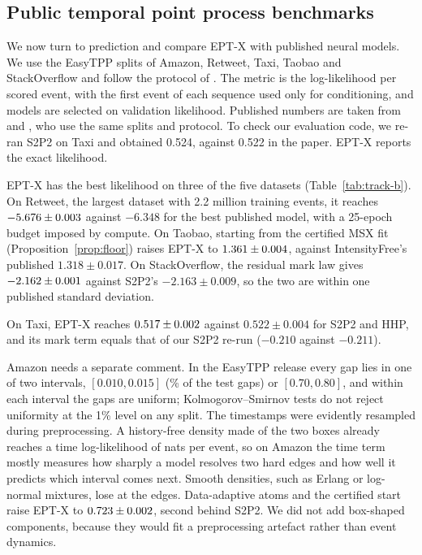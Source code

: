 \begin{table}[!htbp]\centering\small
\caption{Synthetic recovery: held-out log-likelihood deficit to the true model ($10^{-3}$
nats per event, lower is better; mean $\pm$ s.d.\ over five seeds). Bold: best; underlined:
second best; shaded: our estimators.}\label{tab:track-a}
\setlength{\tabcolsep}{5pt}

\end{table}

\FloatBarrier
\subsection{Public temporal point process benchmarks}\label{sec:public}
We now turn to prediction and compare EPT-X with published neural models. We use the EasyTPP splits of Amazon, Retweet, Taxi, Taobao and StackOverflow and follow the
protocol of \citet{chang2025deep}. The metric is the log-likelihood per scored event, with the
first event of each sequence used only for conditioning, and models are selected on validation
likelihood. Published numbers are taken from \citet{chang2025deep} and \citet{boyd2025hyper}, who
use the same splits and protocol. To check our evaluation code, we re-ran S2P2 on Taxi and obtained
0.524, against 0.522 in the paper. EPT-X reports the exact likelihood.

EPT-X has the best likelihood on three of the five datasets (Table~\ref{tab:track-b}). On Retweet,
the largest dataset with 2.2 million training events, it reaches $-5.676\pm0.003$
against $-6.348$ for the best published model, with a 25-epoch budget imposed by compute. On Taobao,
starting from the certified MSX fit (Proposition~\ref{prop:floor}) raises EPT-X to
$1.361\pm0.004$, against IntensityFree's published $1.318\pm0.017$. On
StackOverflow, the residual mark law gives $-2.162\pm0.001$ against
S2P2's $-2.163\pm0.009$, so the two are within one published standard deviation.

On Taxi, EPT-X reaches $0.517\pm0.002$ against $0.522\pm0.004$ for S2P2 and HHP, and
its mark term equals that of our S2P2 re-run ($-0.210$ against $-0.211$).

Amazon needs a separate comment. In the EasyTPP release every gap lies in one of two intervals,
$[0.010,0.015]$ (\amzShortShare\% of the test gaps) or $[0.70,0.80]$, and within each interval the
gaps are uniform; Kolmogorov--Smirnov tests do not reject uniformity at the 1\% level on any split.
The timestamps were evidently resampled during preprocessing. A history-free density made of the
two boxes already reaches a time log-likelihood of \amzBoxLL{} nats per event, so on Amazon the
time term mostly measures how sharply a model resolves two hard edges and how well it predicts
which interval comes next. Smooth densities, such as Erlang or log-normal mixtures, lose at the
edges. Data-adaptive atoms and the certified start raise EPT-X to
$0.723\pm0.002$, second behind S2P2. We did not add box-shaped components, because
they would fit a preprocessing artefact rather than event dynamics.


